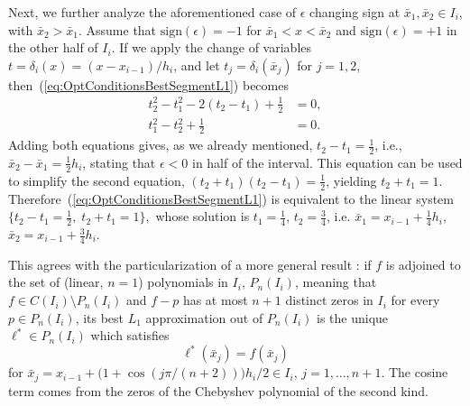 \documentclass[a4paper,english]{IEEEtran}
\begin{document}
Next, we further analyze the aforementioned case of $\epsilon$ changing
sign at $\bar{x}_{1},\bar{x}_{2}\in I_{i}$, with $\bar{x}_{2}>\bar{x}_{1}$.
Assume that ${\text{sign}}(\epsilon)=-1$ for $\bar{x}_{1}<x<\bar{x}_{2}$
and ${\text{sign}}(\epsilon)=+1$ in the other half of $I_{i}$. If we apply
the change of variables $t=\delta_{i}(x)=(x-x_{i-1})/h_{i}$, and
let $t_{j}=\delta_{i}(\bar{x}_{j})$ for $j=1,2$, then~(\ref{eq:OptConditionsBestSegmentL1})
becomes 
\begin{align*}
t_{2}^{2}-t_{1}^{2}-2(t_{2}-t_{1})+\frac{1}{2} & =0,\\
t_{1}^{2}-t_{2}^{2}+\frac{1}{2} & =0.
\end{align*}
 Adding both equations gives, as we already mentioned, $t_{2}-t_{1}=\frac{1}{2}$,
i.e., $\bar{x}_{2}-\bar{x}_{1}=\frac{1}{2}h_{i}$, stating that $\epsilon<0$
in half $ $of the interval. This equation can be used to simplify
the second equation, $(t_{2}+t_{1})(t_{2}-t_{1})=\frac{1}{2}$, yielding
$t_{2}+t_{1}=1$. Therefore~(\ref{eq:OptConditionsBestSegmentL1})
is equivalent to the linear system $\{t_{2}-t_{1}=\frac{1}{2},\; t_{2}+t_{1}=1\},$
whose solution is $t_{1}=\frac{1}{4}$, $t_{2}=\frac{3}{4}$, i.e.
$\bar{x}_{1}=x_{i-1}+\frac{1}{4}h_{i}$, $\bar{x}_{2}=x_{i-1}+\frac{3}{4}h_{i}$. 

This agrees with the particularization of a more general result \cite[Cor.3.4.1]{Rivlin1969}:
if ${f}$ is adjoined to the set of (linear, $n=1$) polynomials in
$I_{i}$, $P_{n}(I_{i})$, meaning that $f\in C(I_{i})\setminus P_{n}(I_{i})$
and $f-p$ has at most $n+1$ distinct zeros in $I_{i}$ for every
$p\in P_{n}(I_{i})$, its best ${L_{1}}$ approximation out of $P_{n}(I_{i})$
is the unique $\ell^{\ast}\in P_{n}(I_{i})$ which satisfies
\[
\ell^{\ast}\left(\bar{x}_{j}\right)={f}\left(\bar{x}_{j}\right)
\]
 for $\bar{x}_{j}=x_{i-1}+\bigl(1+\cos(j\pi/(n+2))\bigr)h_{i}/2\in I_{i}$,
$j=1,\ldots,n+1$. The cosine term comes from the zeros of the Chebyshev
polynomial of the second kind. 
\end{document}
